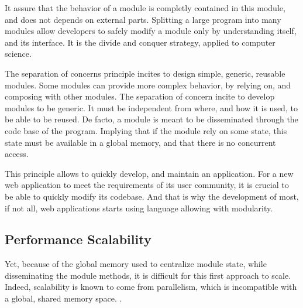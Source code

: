 It assure that the behavior of a module is completly contained in this module, and does not depends on external parts.
Splitting a large program into many modules allow developers to safely modify a module only by understanding itself, and its interface.
It is the divide and conquer strategy, applied to computer science.

The separation of concerns principle incites to design simple, generic, reusable modules. 
Some modules can provide more complex behavior, by relying on, and composing with other modules.
The separation of concern incite to develop modules to be generic.
It must be independent from where, and how it is used, to be able to be reused.
De facto, a module is meant to be disseminated through the code base of the program.
Implying that if the module rely on some state, this state must be available in a global memory, and that there is no concurrent access.

This principle allows to quickly develop, and maintain an application.
For a new web application to meet the requirements of its user community, it is crucial to be able to quickly modify its codebase.
And that is why the development of most, if not all, web applications starts using language allowing with modularity.


\subsection{Performance Scalability}



Yet, because of the global memory used to centralize module state, while disseminating the module methods, it is difficult for this first approach to scale.
Indeed, scalability is known to come from parallelism, which is incompatible with a global, shared memory space.
.


